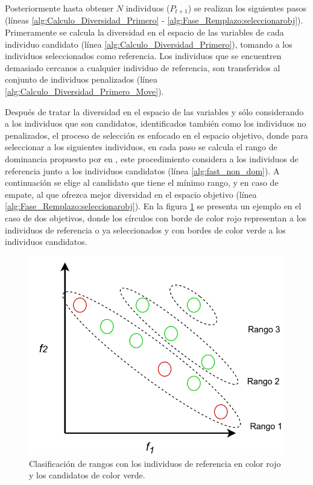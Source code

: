 %
Posteriormente hasta obtener $N$ individuos ($P_{t+1}$) se realizan los siguientes pasos (líneas \ref{alg:Calculo_Diversidad_Primero} - \ref{alg:Fase_Remplazo:seleccionarobj}).
%
Primeramente se calcula la diversidad en el espacio de las variables de cada individuo candidato (línea \ref{alg:Calculo_Diversidad_Primero}), tomando a los individuos seleccionados como referencia.
%
Los individuos que se encuentren demasiado cercanos a cualquier individuo de referencia, son transferidos al conjunto de individuos penalizados (línea \ref{alg:Calculo_Diversidad_Primero_Move}).
%

Después de tratar la diversidad en el espacio de las variables y sólo considerando a los individuos que son candidatos, identificados también como los individuos no penalizados, el proceso de selección es enfocado en el espacio objetivo, donde para seleccionar a los siguientes individuos, en cada paso se calcula el rango de dominancia propuesto por \citeauthor{Joel:NSGAII} en \cite{Joel:NSGAII}, este procedimiento considera a los individuos de referencia junto a los individuos candidatos (línea \ref{alg:fast_non_dom}).
%
A continuación se elige al candidato que tiene el mínimo rango, y en caso de empate, al que ofrezca mejor diversidad en el espacio objetivo (línea \ref{alg:Fase_Remplazo:seleccionarobj}).
%
En la figura \ref{fig:Rangos} se presenta un ejemplo en el caso de dos objetivos, donde los círculos con borde de color rojo representan a los individuos de referencia o ya seleccionados y con bordes de color verde a los individuos candidatos.
%

\begin{figure}[H]
\centering
\scriptsize
\includegraphics[scale=0.2]
{Figures_Chapter3/Rangos.png}
\decoRule
\caption{Clasificación de rangos con los individuos de referencia en color rojo y los  candidatos de color verde.}
\label{fig:Rangos}
\end{figure}


